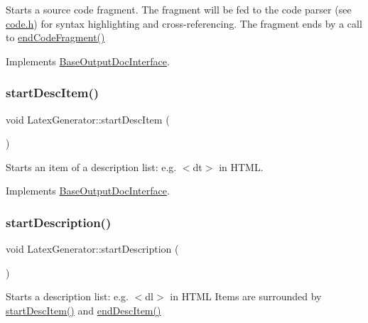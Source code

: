 Starts a source code fragment. The fragment will be fed to the code parser (see \mbox{\hyperlink{code_8h_source}{code.\+h}}) for syntax highlighting and cross-\/referencing. The fragment ends by a call to \mbox{\hyperlink{class_latex_generator_a761292f353178bad45e21ca40cbe6115}{end\+Code\+Fragment()}} 

Implements \mbox{\hyperlink{class_base_output_doc_interface_ab19fc767b08c25b0ca7c976d24799bda}{Base\+Output\+Doc\+Interface}}.

\mbox{\label{class_latex_generator_a92603047f2bff0fef3c2bd5ed1be73d9}} 
\subsubsection{\texorpdfstring{startDescItem()}{startDescItem()}}
{\footnotesize\ttfamily void Latex\+Generator\+::start\+Desc\+Item (\begin{DoxyParamCaption}{ }\end{DoxyParamCaption})\hspace{0.3cm}{\ttfamily [virtual]}}

Starts an item of a description list\+: e.\+g. {\ttfamily $<$dt$>$} in H\+T\+ML. 

Implements \mbox{\hyperlink{class_base_output_doc_interface_a5d1cc59d94c3f529c90e0a06704be181}{Base\+Output\+Doc\+Interface}}.

\mbox{\label{class_latex_generator_a32a518fb74711bc0e791c03e95c666cb}} 
\subsubsection{\texorpdfstring{startDescription()}{startDescription()}}
{\footnotesize\ttfamily void Latex\+Generator\+::start\+Description (\begin{DoxyParamCaption}{ }\end{DoxyParamCaption})\hspace{0.3cm}{\ttfamily [virtual]}}

Starts a description list\+: e.\+g. {\ttfamily $<$dl$>$} in H\+T\+ML Items are surrounded by \mbox{\hyperlink{class_latex_generator_a92603047f2bff0fef3c2bd5ed1be73d9}{start\+Desc\+Item()}} and \mbox{\hyperlink{class_latex_generator_aa675b530ccd61f9c4784efc2abcedbaa}{end\+Desc\+Item()}} 

